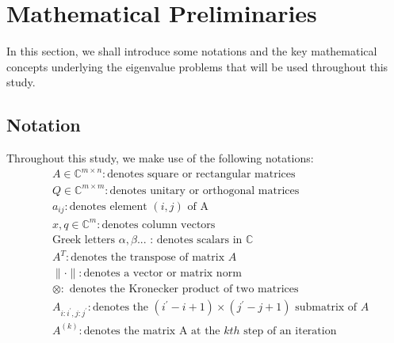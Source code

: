 \section{Mathematical Preliminaries}
In this section, we shall introduce some notations and the key mathematical concepts underlying the eigenvalue problems that will be used throughout this study.
\subsection{Notation}
Throughout this study, we make use of the following notations:
\begin{align*}\nonumber
	&A \in \mathbb{C}^{m\times n}: \text{denotes square or rectangular matrices}\\
	&Q \in \mathbb{C}^{m\times m}: \text{denotes unitary or orthogonal matrices}\\
	&a_{ij}: \text{denotes element $(i, j)$ of A}\\
	&x, q \in \mathbb{C}^{m}: \text{denotes column vectors}\\
	&\text{Greek letters }\alpha, \beta\text{...} \text{ : denotes scalars in $\mathbb{C}$}\\
	&A^{T}: \text{denotes the transpose of matrix $A$}\\
	&\| \cdot \|: \text{denotes a vector or matrix norm }\\
	& \otimes: \text{ denotes the Kronecker product of two matrices}\\
	&A_{i:i^\prime, j:j^\prime}: \text{denotes the $(i^\prime - i + 1) \times (j^\prime - j + 1)$ submatrix of $A$}\\
	&A^{(k)}: \text{denotes the matrix A at the $kth$ step of an iteration}
\end{align*}
